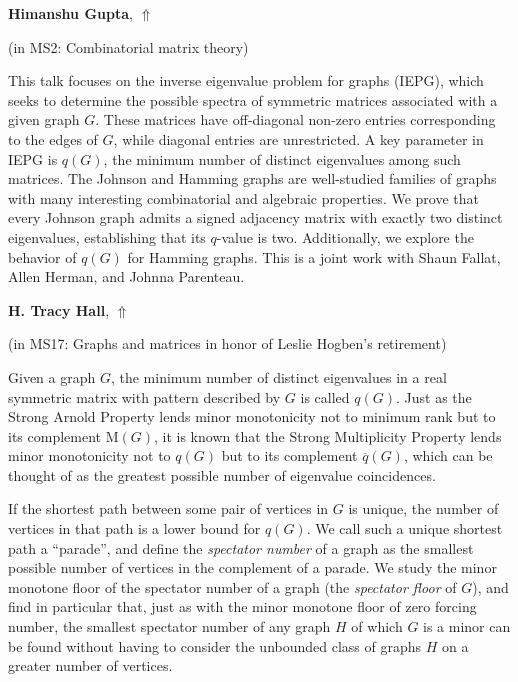 \documentclass[ILAS2025-program.tex]{subfiles}
\begin{document}
\hypertarget{down0264}{}\begin{ilasabstract}
    
\textbf{Himanshu Gupta},  \hfill \hyperlink{up0264}{$\Uparrow$}
    
    
(in {\color{mstitle}MS2: Combinatorial matrix theory})
        
\mtskip
    This talk focuses on the inverse eigenvalue problem for graphs (IEPG), which seeks to determine the possible spectra of symmetric matrices associated with a given graph $G$. These matrices have off-diagonal non-zero entries corresponding to the edges of $G$, while diagonal entries are unrestricted. A key parameter in IEPG is $q(G)$, the minimum number of distinct eigenvalues among such matrices. The Johnson and Hamming graphs are well-studied families of graphs with many interesting combinatorial and algebraic properties. We prove that every Johnson graph admits a signed adjacency matrix with exactly two distinct eigenvalues, establishing that its $q$-value is two. Additionally, we explore the behavior of $q(G)$ for Hamming graphs. This is a joint work with Shaun Fallat, Allen Herman, and Johnna Parenteau. 

\end{ilasabstract}
    

\hypertarget{down0377}{}\begin{ilasabstract}
    
\textbf{H. Tracy Hall},  \hfill \hyperlink{up0377}{$\Uparrow$}
    
    
(in {\color{mstitle}MS17: Graphs and matrices in honor of Leslie Hogben's retirement})
        
\mtskip
    Given a graph $G$, the minimum number of distinct eigenvalues
in a real symmetric matrix with pattern described by $G$ is called $q(G)$.
Just as the Strong Arnold Property lends minor monotonicity not to minimum rank but to its complement $\mathrm{M}(G)$,
it is known that the Strong Multiplicity Property lends minor monotonicity not
to $q(G)$ but to its complement $\overline{q}(G)$, which can be thought
of as the greatest possible number of eigenvalue coincidences.

If the shortest path between some pair of vertices in $G$ is unique,
the number of vertices in that path is a lower bound for $q(G)$.
We call such a unique shortest path a ``parade'', and define the
\emph{spectator number} of a graph as the smallest possible number of vertices in the complement of a parade.
We study the minor monotone floor of the spectator number of a graph (the \emph{spectator floor} of $G$), and find in particular that, just as with the minor monotone floor of zero forcing number,
the smallest spectator number of any graph $H$ of which $G$ is a minor can be found without having to consider the unbounded class of graphs $H$ on a greater number of vertices.
\end{ilasabstract}
    
\end{document}
